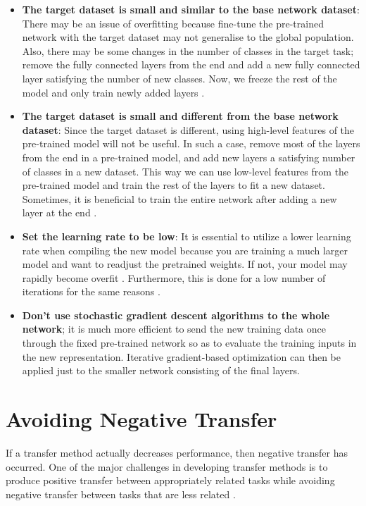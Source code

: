 \documentclass[11pt]{article}
\begin{document}
\begin{itemize}
    \item \textbf{The target dataset is small and similar to the base network dataset}: There may be an issue of overfitting because fine-tune the pre-trained network with the target dataset may not generalise to the global population. Also, there may be some changes in the number of classes in the target task; remove the fully connected layers from the end and add a new fully connected layer satisfying the number of new classes. Now, we freeze the rest of the model and only train newly added layers \cite{geeks-transfer-learning}.
    \item \textbf{The target dataset is small and different from the base network dataset}: Since the target dataset is different, using high-level features of the pre-trained model will not be useful. In such a case, remove most of the layers from the end in a pre-trained model, and add new layers a satisfying number of classes in a new dataset. This way we can use low-level features from the pre-trained model and train the rest of the layers to fit a new dataset. Sometimes, it is beneficial to train the entire network after adding a new layer at the end \cite{geeks-transfer-learning}.
    \item \textbf{Set the learning rate to be low}: It is essential to utilize a lower learning rate when compiling the new model because you are training a much larger model and want to readjust the pretrained weights. If not, your model may rapidly become overfit \cite{geeks-transfer-learning}. Furthermore, this is done for a low number of iterations for the same reasons \cite{deep-learning-book}.
    \item \textbf{Don't use stochastic gradient descent algorithms to the whole network}; it is much more efficient to send the new training data once through the fixed pre-trained network so as to evaluate the training inputs in the new representation. Iterative gradient-based optimization can then be applied just to the smaller network consisting of the final     layers.
\end{itemize}

\section{Avoiding Negative Transfer} \label{sec:negative-transfer}

If a transfer method actually decreases performance, then negative transfer has occurred. One of the major challenges in developing transfer methods is to produce positive transfer between appropriately related tasks while avoiding negative transfer between tasks that are less related \cite{torrey-handbook}.
\end{document}
